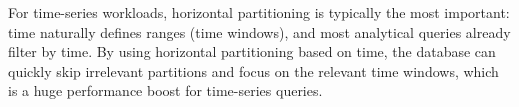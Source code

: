 \noindent\cite{TigerData:01}

For time-series workloads, horizontal partitioning is typically the most
important: time naturally defines ranges (time windows), and most analytical
queries already filter by time. By using horizontal partitioning based on time,
the database can quickly skip irrelevant partitions and focus on the relevant
time windows, which is a huge performance boost for time-series
queries.\cite{TigerData:01}